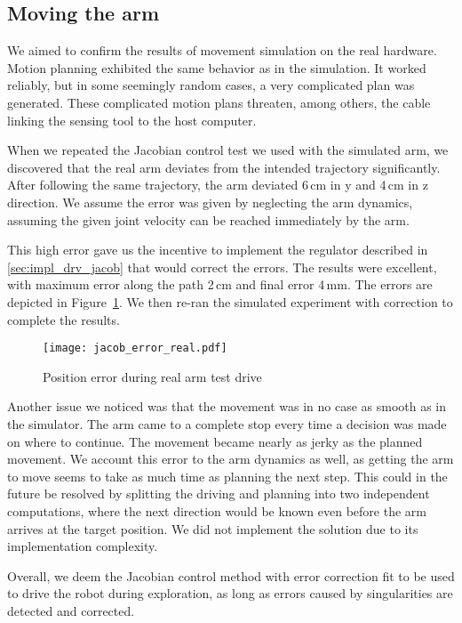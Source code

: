 \documentclass[buriama8_dp.tex]{subfiles}
\begin{document}
\subsection{Moving the arm}
\label{subsec:exp_move_real}

We aimed to confirm the results of movement simulation on the real hardware. Motion planning exhibited the same behavior as in the simulation. It worked reliably, but in some seemingly random cases, a very complicated plan was generated. These complicated motion plans threaten, among others, the cable linking the sensing tool to the host computer.

When we repeated the Jacobian control test we used with the simulated arm, we discovered that the real arm deviates from the intended trajectory significantly. After following the same trajectory, the arm deviated 6\,cm in \m y and 4\,cm in \m z direction. We assume the error was given by neglecting the arm dynamics, assuming the given joint velocity can be reached immediately by the arm.

This high error gave us the incentive to implement the regulator described in \ref{sec:impl_drv_jacob} that would correct the errors. The results were excellent, with maximum error along the path 2\,cm and final error 4\,mm. The errors are depicted in Figure~\ref{fig:err_jac_real}. We then re-ran the simulated experiment with correction to complete the results.

\begin{figure}[ht]
  \centering
  \texttt{[image: jacob\_error\_real.pdf]}
  \caption{Position error during real arm test drive}
  \label{fig:err_jac_real}
\end{figure}

Another issue we noticed was that the movement was in no case as smooth as in the simulator. The arm came to a complete stop every time a decision was made on where to continue. The movement became nearly as jerky as the planned movement. We account this error to the arm dynamics as well, as getting the arm to move seems to take as much time as planning the next step. This could in the future be resolved by splitting the driving and planning into two independent computations, where the next direction would be known even before the arm arrives at the target position. We did not implement the solution due to its implementation complexity.

Overall, we deem the Jacobian control method with error correction fit to be used to drive the robot during exploration, as long as errors caused by singularities are detected and corrected.
\end{document}
